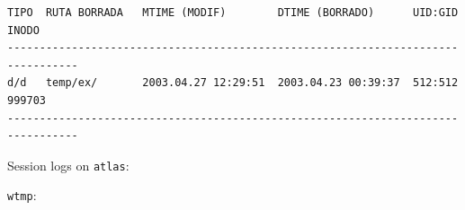 \vspace{1em}

\begin{lstlisting}[style=terminal]
TIPO  RUTA BORRADA   MTIME (MODIF)        DTIME (BORRADO)      UID:GID  INODO
---------------------------------------------------------------------------------
d/d   temp/ex/       2003.04.27 12:29:51  2003.04.23 00:39:37  512:512  999703
---------------------------------------------------------------------------------
\end{lstlisting}

\vspace{1em}

Session logs on \texttt{atlas}:

\texttt{wtmp}:

\vspace{1em}

